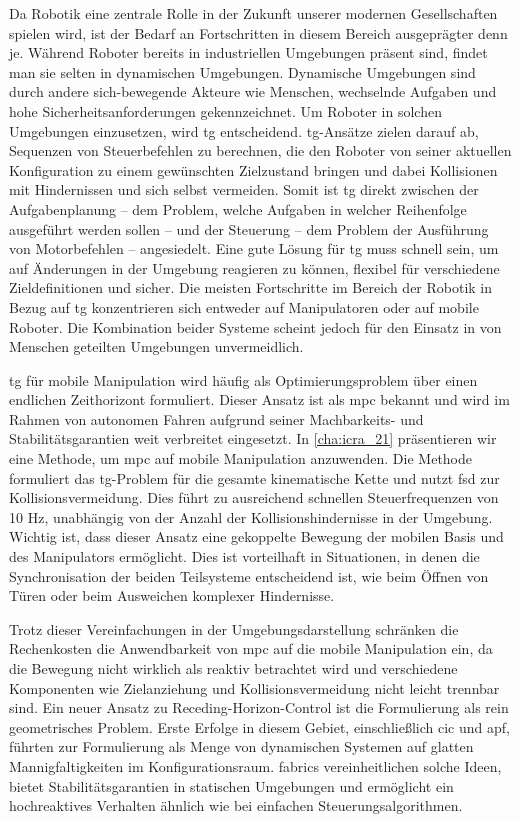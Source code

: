 \acresetall
Da Robotik eine zentrale Rolle in der Zukunft unserer modernen Gesellschaften
spielen wird, ist der Bedarf an Fortschritten in diesem Bereich ausgeprägter
denn je. Während Roboter bereits in industriellen Umgebungen präsent sind,
findet man sie selten in dynamischen Umgebungen. Dynamische Umgebungen sind
durch andere sich-bewegende Akteure wie Menschen, wechselnde Aufgaben und hohe
Sicherheitsanforderungen gekennzeichnet. Um Roboter in solchen Umgebungen
einzusetzen, wird \ac{tg} entscheidend. \Ac{tg}-Ansätze zielen darauf ab,
Sequenzen von Steuerbefehlen zu berechnen, die den Roboter von seiner aktuellen
Konfiguration zu einem gewünschten Zielzustand bringen und dabei Kollisionen mit
Hindernissen und sich selbst vermeiden. Somit ist \ac{tg} direkt zwischen der
Aufgabenplanung – dem Problem, welche Aufgaben in welcher Reihenfolge ausgeführt
werden sollen – und der Steuerung – dem Problem der Ausführung von Motorbefehlen
– angesiedelt. Eine gute Lösung für \ac{tg} muss schnell sein, um auf Änderungen
in der Umgebung reagieren zu können, flexibel für verschiedene Zieldefinitionen
und sicher. Die meisten Fortschritte im Bereich der Robotik in
Bezug auf \ac{tg} konzentrieren sich entweder auf Manipulatoren oder auf mobile
Roboter. Die Kombination beider Systeme scheint jedoch für den Einsatz in von
Menschen geteilten Umgebungen unvermeidlich.

\Ac{tg} für mobile Manipulation wird häufig als Optimierungsproblem über
einen endlichen Zeithorizont formuliert. Dieser Ansatz ist als \ac{mpc} bekannt
und wird im Rahmen von autonomen Fahren aufgrund seiner Machbarkeits- und
Stabilitätsgarantien weit verbreitet eingesetzt. In \cref{cha:icra_21}
präsentieren wir eine Methode, um \ac{mpc} auf mobile Manipulation anzuwenden.
Die Methode formuliert das \ac{tg}-Problem für die gesamte kinematische Kette
und nutzt \ac{fsd} zur Kollisionsvermeidung. Dies führt zu ausreichend schnellen
Steuerfrequenzen von 10 Hz, unabhängig von der Anzahl der Kollisionshindernisse
in der Umgebung. Wichtig ist, dass dieser Ansatz eine gekoppelte Bewegung der
mobilen Basis und des Manipulators ermöglicht. Dies ist vorteilhaft in
Situationen, in denen die Synchronisation der beiden Teilsysteme entscheidend
ist, wie beim Öffnen von Türen oder beim Ausweichen komplexer Hindernisse.

Trotz dieser Vereinfachungen in der Umgebungsdarstellung schränken die
Rechenkosten die Anwendbarkeit von \ac{mpc} auf die mobile Manipulation ein, da
die Bewegung nicht wirklich als reaktiv betrachtet wird und verschiedene Komponenten
wie Zielanziehung und Kollisionsvermeidung nicht leicht trennbar sind. Ein neuer
Ansatz zu Receding-Horizon-Control ist die Formulierung als rein
geometrisches Problem. Erste Erfolge in diesem Gebiet, einschließlich \ac{cic}
und \ac{apf}, führten zur Formulierung als Menge von dynamischen Systemen auf
glatten Mannigfaltigkeiten im Konfigurationsraum. \Ac{fabrics}
vereinheitlichen solche Ideen, bietet Stabilitätsgarantien in statischen
Umgebungen und ermöglicht ein hochreaktives Verhalten ähnlich wie bei einfachen
Steuerungsalgorithmen.

